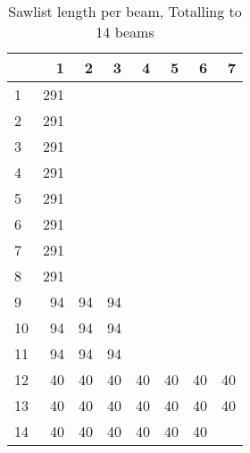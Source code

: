 \begin{table}[h!]
\centering
\caption{Sawlist length per beam, Totalling to 14 beams}
\begin{tabular}{lrrrrrrr}
\toprule
{} &   1 &  2 &  3 &  4 &  5 &  6 &  7 \\
\midrule
1  & 291 &    &    &    &    &    &    \\
2  & 291 &    &    &    &    &    &    \\
3  & 291 &    &    &    &    &    &    \\
4  & 291 &    &    &    &    &    &    \\
5  & 291 &    &    &    &    &    &    \\
6  & 291 &    &    &    &    &    &    \\
7  & 291 &    &    &    &    &    &    \\
8  & 291 &    &    &    &    &    &    \\
9  &  94 & 94 & 94 &    &    &    &    \\
10 &  94 & 94 & 94 &    &    &    &    \\
11 &  94 & 94 & 94 &    &    &    &    \\
12 &  40 & 40 & 40 & 40 & 40 & 40 & 40 \\
13 &  40 & 40 & 40 & 40 & 40 & 40 & 40 \\
14 &  40 & 40 & 40 & 40 & 40 & 40 &    \\
\bottomrule
\end{tabular}
\end{table}
